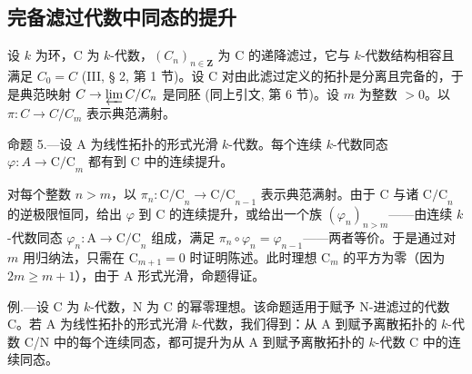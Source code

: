 \subsection{完备滤过代数中同态的提升}

设 \(k\) 为环，C 为 \(k\)-代数，\((C_n)_{n \in \mathbf{Z}}\) 为 C 的递降滤过，它与 \(k\)-代数结构相容且满足 \(C_0 = C\) (III, § 2, 第 1 节)。设 C 对由此滤过定义的拓扑是分离且完备的，于是典范映射 \(C \to \varprojlim C / C_n\) 是同胚 (同上引文, 第 6 节)。设 \(m\) 为整数 \(>0\)。以 \(\pi: C \to C / C_m\) 表示典范满射。

命题 5.—设 A 为线性拓扑的形式光滑 \(k\)-代数。每个连续 \(k\)-代数同态 \(\varphi: A \to \mathrm{C/C}_{m}\) 都有到 C 中的连续提升。

对每个整数 \(n > m\)，以 \(\pi_n: \mathrm{C/C}_n \to \mathrm{C/C}_{n-1}\) 表示典范满射。由于 C 与诸 \(\mathrm{C/C}_n\) 的逆极限恒同，给出 \(\varphi\) 到 C 的连续提升，或给出一个族 \((\varphi_n)_{n > m}\)——由连续 \(k\)-代数同态 \(\varphi_n: \mathrm{A} \to \mathrm{C/C}_n\) 组成，满足 \(\pi_n \circ \varphi_n = \varphi_{n-1}\)——两者等价。于是通过对 \(m\) 用归纳法，只需在 \(\mathrm{C}_{m+1} = 0\) 时证明陈述。此时理想 \(\mathrm{C}_m\) 的平方为零（因为 \(2m \geqslant m+1\)），由于 A 形式光滑，命题得证。

例.—设 C 为 \(k\)-代数，N 为 C 的幂零理想。该命题适用于赋予 N-进滤过的代数 C。若 A 为线性拓扑的形式光滑 \(k\)-代数，我们得到：从 A 到赋予离散拓扑的 \(k\)-代数 C/N 中的每个连续同态，都可提升为从 A 到赋予离散拓扑的 \(k\)-代数 C 中的连续同态。

